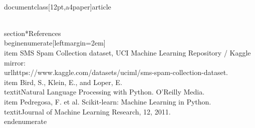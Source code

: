 \\documentclass[12pt,a4paper]{article}
\begin{document}
\\section*{References}
\\begin{enumerate}[leftmargin=2em]
    \\item SMS Spam Collection dataset, UCI Machine Learning Repository / Kaggle mirror: \\url{https://www.kaggle.com/datasets/uciml/sms-spam-collection-dataset}.
    \\item Bird, S., Klein, E., and Loper, E. \\textit{Natural Language Processing with Python}. O'Reilly Media.
    \\item Pedregosa, F. et al. Scikit-learn: Machine Learning in Python. \\textit{Journal of Machine Learning Research}, 12, 2011.
\\end{enumerate}
\
\end{document}
